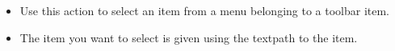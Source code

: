 
\begin{itemize}
\item Use this action to select an item from a menu belonging to a toolbar item.
\item The item you want to select is given using the textpath to the item.
\end{itemize}
